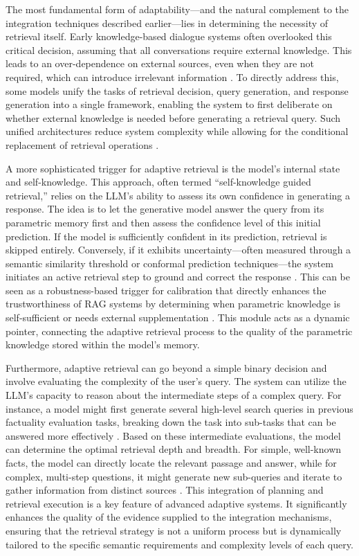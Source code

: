 \documentclass[11pt]{article}
\begin{document}
The most fundamental form of adaptability---and the natural complement to the integration techniques described earlier---lies in determining the necessity of retrieval itself. Early knowledge-based dialogue systems often overlooked this critical decision, assuming that all conversations require external knowledge. This leads to an over-dependence on external sources, even when they are not required, which can introduce irrelevant information \cite{ref46}. To directly address this, some models unify the tasks of retrieval decision, query generation, and response generation into a single framework, enabling the system to first deliberate on whether external knowledge is needed before generating a retrieval query. Such unified architectures reduce system complexity while allowing for the conditional replacement of retrieval operations \cite{ref46}.

A more sophisticated trigger for adaptive retrieval is the model's internal state and self-knowledge. This approach, often termed ``self-knowledge guided retrieval,'' relies on the LLM's ability to assess its own confidence in generating a response. The idea is to let the generative model answer the query from its parametric memory first and then assess the confidence level of this initial prediction. If the model is sufficiently confident in its prediction, retrieval is skipped entirely. Conversely, if it exhibits uncertainty---often measured through a semantic similarity threshold or conformal prediction techniques---the system initiates an active retrieval step to ground and correct the response \cite{ref47}. This can be seen as a robustness-based trigger for calibration that directly enhances the trustworthiness of RAG systems by determining when parametric knowledge is self-sufficient or needs external supplementation \cite{ref47}. This module acts as a dynamic pointer, connecting the adaptive retrieval process to the quality of the parametric knowledge stored within the model's memory.

Furthermore, adaptive retrieval can go beyond a simple binary decision and involve evaluating the complexity of the user's query. The system can utilize the LLM's capacity to reason about the intermediate steps of a complex query. For instance, a model might first generate several high-level search queries in previous factuality evaluation tasks, breaking down the task into sub-tasks that can be answered more effectively \cite{ref48}. Based on these intermediate evaluations, the model can determine the optimal retrieval depth and breadth. For simple, well-known facts, the model can directly locate the relevant passage and answer, while for complex, multi-step questions, it might generate new sub-queries and iterate to gather information from distinct sources \cite{ref48}. This integration of planning and retrieval execution is a key feature of advanced adaptive systems. It significantly enhances the quality of the evidence supplied to the integration mechanisms, ensuring that the retrieval strategy is not a uniform process but is dynamically tailored to the specific semantic requirements and complexity levels of each query.
\end{document}
